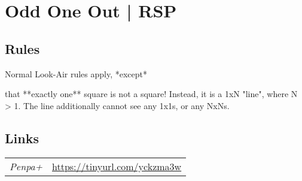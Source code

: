 \section[Odd One Out | RSP {[\emph{Look-Air (One One)}]}]{Odd One Out | {\normalfont RSP}}
\label{sec:45-odd-one-out-look-air-rsp}

\subsection*{Rules}
\begin{markdown}
Normal Look-Air rules apply, *except*



that **exactly one** square is not a square! Instead, it is a 1xN "line", where N > 1. The line additionally cannot see any 1x1s, or any NxNs.
\end{markdown}
\subsection*{Links}
\begin{tabularx}{\textwidth}{l X}
\emph{Penpa+} & \url{https://tinyurl.com/yckzma3w} \\
\end{tabularx}
\pagebreak

